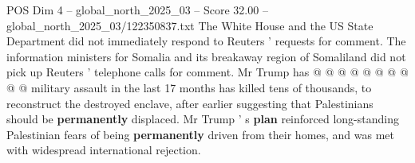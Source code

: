 \begin{textsample}{POS Dim 4 – global\_north\_2025\_03 – Score 32.00 – global\_north\_2025\_03/122350837.txt}
The White House and the US State Department did not immediately respond to Reuters ' requests for comment.
The information ministers for Somalia and its breakaway region of Somaliland did not pick up Reuters ' telephone calls for comment.
Mr Trump has @ @ @ @ @ @ @ @ @ @ military assault in the last 17 months has killed tens of thousands, to reconstruct the destroyed enclave, after earlier suggesting that Palestinians should be \textbf{permanently} displaced.
Mr Trump ' s \textbf{plan} reinforced long-standing Palestinian fears of being \textbf{permanently} driven from their homes, and was met with widespread international rejection.

\end{textsample}

